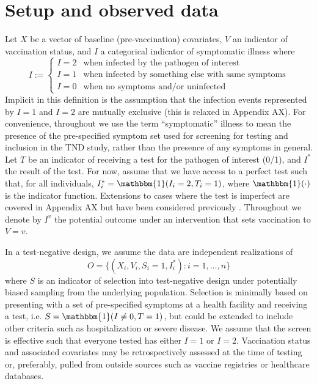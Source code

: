 \documentclass[11pt]{article}
\begin{document}
\section{Setup and observed data} \label{sec:setup}
Let $X$ be a vector of baseline (pre-vaccination) covariates, $V$ an indicator of vaccination status, and $I$ a categorical indicator of symptomatic illness where
        $$I := \begin{cases} 
        I = 2 & \text{when infected by the pathogen of interest} \\
        I = 1 & \text{when infected by something else with same symptoms} \\
        I = 0 & \text{when no symptoms and/or uninfected}
        \end{cases}$$
Implicit in this definition is the assumption that the infection events represented by $I = 1$ and $I = 2$ are mutually exclusive (this is relaxed in Appendix AX). For convenience, throughout we use the term ``symptomatic'' illness to mean the presence of the pre-specified symptom set used for screening for testing and inclusion in the TND study, rather than the presence of any symptoms in general. Let $T$ be an indicator of receiving a test for the pathogen of interest (0/1), and $I^*$ the result of the test. For now, assume that we have access to a perfect test such that, for all individuals, $I^*_i = \mathbbm{1}(I_i = 2, T_i = 1)$, where $\mathbbm{1}(\cdot)$ is the indicator function. Extensions to cases where the test is imperfect are covered in Appendix AX but have been considered previously \cite{jackson2015effects}. Throughout we denote by $I^v$ the potential outcome under an intervention that sets vaccination to $V=v$. 
    
In a test-negative design, we assume the data are independent realizations of 
$$O = \{(X_i, V_i, S_i = 1, I^*_i) : i = 1, \ldots, n\}$$
where $S$ is an indicator of selection into test-negative design under potentially biased sampling from the underlying population. Selection is minimally based on presenting with a set of pre-specified symptoms at a health facility and receiving a test, i.e. $S = \mathbbm{1}(I \neq 0, T = 1)$, but could be extended to include other criteria such as hospitalization or severe disease. We assume that the screen is effective such that everyone tested has either $I=1$ or $I=2$. Vaccination status and associated covariates may be retrospectively assessed at the time of testing or, preferably, pulled from outside sources such as vaccine registries or healthcare databases. 
\end{document}
